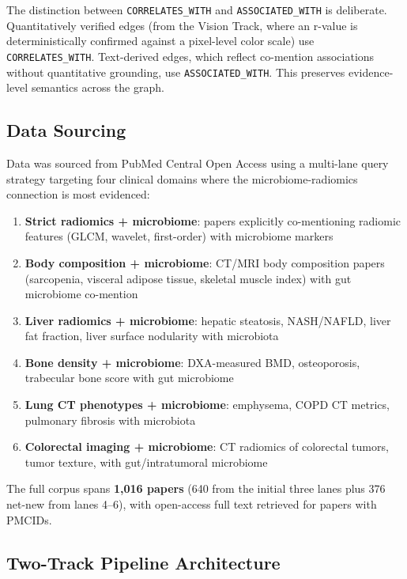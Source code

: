 \documentclass[12pt, letterpaper]{article}
\begin{document}
The distinction between \texttt{CORRELATES\_WITH} and \texttt{ASSOCIATED\_WITH} is deliberate. Quantitatively verified edges (from the Vision Track, where an r-value is deterministically confirmed against a pixel-level color scale) use \texttt{CORRELATES\_WITH}. Text-derived edges, which reflect co-mention associations without quantitative grounding, use \texttt{ASSOCIATED\_WITH}. This preserves evidence-level semantics across the graph.

\subsection{Data Sourcing}

Data was sourced from PubMed Central Open Access using a multi-lane query strategy targeting four clinical domains where the microbiome-radiomics connection is most evidenced:

\begin{enumerate}
    \item \textbf{Strict radiomics + microbiome}: papers explicitly co-mentioning radiomic features (GLCM, wavelet, first-order) with microbiome markers
    \item \textbf{Body composition + microbiome}: CT/MRI body composition papers (sarcopenia, visceral adipose tissue, skeletal muscle index) with gut microbiome co-mention
    \item \textbf{Liver radiomics + microbiome}: hepatic steatosis, NASH/NAFLD, liver fat fraction, liver surface nodularity with microbiota
    \item \textbf{Bone density + microbiome}: DXA-measured BMD, osteoporosis, trabecular bone score with gut microbiome
    \item \textbf{Lung CT phenotypes + microbiome}: emphysema, COPD CT metrics, pulmonary fibrosis with microbiota
    \item \textbf{Colorectal imaging + microbiome}: CT radiomics of colorectal tumors, tumor texture, with gut/intratumoral microbiome
\end{enumerate}

The full corpus spans \textbf{1,016 papers} (640 from the initial three lanes plus 376 net-new from lanes 4--6), with open-access full text retrieved for papers with PMCIDs.

\subsection{Two-Track Pipeline Architecture}
\end{document}
